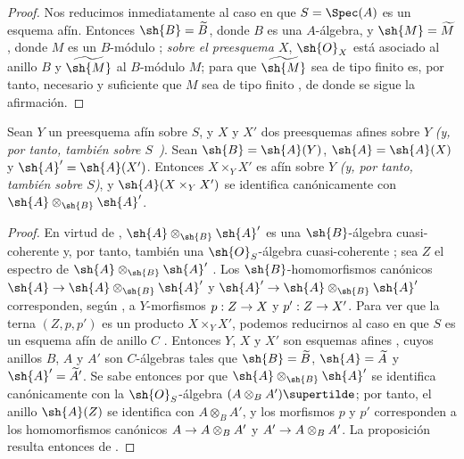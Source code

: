 \documentclass[oneside,10pt]{amsart}
\makeatletter
\newcommand{\ega@arrow}[2]{\mathchoice{#1}{#2}{#2}{#2}}
\renewcommand{\to}{\ega@arrow{\longrightarrow}{\rightarrow}}
\let\EGAOriginalLabel\label
\renewcommand{\label}[1]{\phantomsection\EGAOriginalLabel{#1}}
\makeatother
\begin{document}
\begin{proof}
Nos reducimos inmediatamente al caso en que $S=\Spec(A)$ es un esquema afín.
Entonces $\sh{B}=\widetilde{B}$, donde $B$ es una $A$-álgebra, y $\sh{M}=\widetilde{M}$, donde $M$ es un $B$-módulo ; \emph{sobre el preesquema $X$}, $\sh{O}_X$ está asociado al anillo $B$ y $\widetilde{\sh{M}}$ al $B$-módulo $M$; para que $\widetilde{\sh{M}}$ sea de tipo finito es, por tanto, necesario y suficiente que $M$ sea de tipo finito , de donde se sigue la afirmación.
\end{proof}

\begin{proposition}[1.4.6]
\label{II.1.4.6}
Sean $Y$ un preesquema afín sobre $S$, y $X$ y $X'$ dos preesquemas afines sobre $Y$ \emph{(y, por tanto, también sobre $S$~)}.
Sean $\sh{B}=\sh{A}(Y)$, $\sh{A}=\sh{A}(X)$ y $\sh{A}'=\sh{A}(X')$.
Entonces $X\times_Y X'$ es afín sobre $Y$ \emph{(y, por tanto, también sobre $S$)}, y $\sh{A}(X\times_Y X')$ se identifica canónicamente con $\sh{A}\otimes_\sh{B}\sh{A}'$.
\end{proposition}

\begin{proof}
En virtud de , $\sh{A}\otimes_\sh{B}\sh{A}'$ es una $\sh{B}$-álgebra cuasi-coherente y, por tanto, también una $\sh{O}_S$-álgebra cuasi-coherente ; sea $Z$ el espectro de $\sh{A}\otimes_\sh{B}\sh{A}'$ .
Los $\sh{B}$-homomorfismos canónicos $\sh{A}\to\sh{A}\otimes_\sh{B}\sh{A}'$ y $\sh{A}'\to\sh{A}\otimes_\sh{B}\sh{A}'$ corresponden, según , a $Y$-morfismos $p:Z\to X$ y $p':Z\to X'$.
Para ver que la terna $(Z,p,p')$ es un producto $X\times_Y X'$, podemos reducirnos al caso en que $S$ es un esquema afín de anillo $C$ .
Entonces $Y$, $X$ y $X'$ son esquemas afines , cuyos anillos $B$, $A$ y $A'$ son $C$-álgebras tales que $\sh{B}=\widetilde{B}$, $\sh{A}=\widetilde{A}$ y $\sh{A}'=\widetilde A'$.
Se sabe entonces por  que $\sh{A}\otimes_\sh{B}\sh{A}'$ se identifica canónicamente con la $\sh{O}_S$-álgebra $(A\otimes_B A')\supertilde$; por tanto, el anillo $\sh{A}(Z)$ se identifica con $A\otimes_B A'$, y los morfismos $p$ y $p'$ corresponden a los homomorfismos canónicos $A\to A\otimes_B A'$ y $A'\to A\otimes_B A'$.
La proposición resulta entonces de .
\end{proof}
\end{document}
